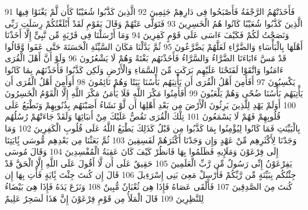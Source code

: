 \documentclass[20pt,a4paper]{article}
\begin{document}
{\tiny\colorbox{cl_aya}{91}} فَأَخَذَتْهُمُ الرَّجْفَةُ فَأَصْبَحُوا فِى دَارِهِمْ جَثِمِينَ
{\tiny\colorbox{cl_aya}{92}} الَّذِينَ كَذَّبُوا شُعَيْبًا كَأَن لَّمْ يَغْنَوْا فِيهَا الَّذِينَ كَذَّبُوا شُعَيْبًا كَانُوا هُمُ الْخَسِرِينَ
{\tiny\colorbox{cl_aya}{93}} فَتَوَلَّى عَنْهُمْ وَقَالَ يَقَوْمِ لَقَدْ أَبْلَغْتُكُمْ رِسَلَتِ رَبِّى وَنَصَحْتُ لَكُمْ فَكَيْفَ ءَاسَى عَلَى قَوْمٍ كَفِرِينَ
{\tiny\colorbox{cl_aya}{94}} وَمَا أَرْسَلْنَا فِى قَرْيَةٍ مِّن نَّبِىٍّ إِلَّا أَخَذْنَا أَهْلَهَا بِالْبَأْسَاءِ وَالضَّرَّاءِ لَعَلَّهُمْ يَضَّرَّعُونَ
{\tiny\colorbox{cl_aya}{95}} ثُمَّ بَدَّلْنَا مَكَانَ السَّيِّئَةِ الْحَسَنَةَ حَتَّى عَفَوا وَّقَالُوا قَدْ مَسَّ ءَابَاءَنَا الضَّرَّاءُ وَالسَّرَّاءُ فَأَخَذْنَهُم بَغْتَةً وَهُمْ لَا يَشْعُرُونَ
{\tiny\colorbox{cl_aya}{96}} وَلَوْ أَنَّ أَهْلَ الْقُرَى ءَامَنُوا وَاتَّقَوْا لَفَتَحْنَا عَلَيْهِم بَرَكَتٍ مِّنَ السَّمَاءِ وَالْأَرْضِ وَلَكِن كَذَّبُوا فَأَخَذْنَهُم بِمَا كَانُوا يَكْسِبُونَ
{\tiny\colorbox{cl_aya}{97}} أَفَأَمِنَ أَهْلُ الْقُرَى أَن يَأْتِيَهُم بَأْسُنَا بَيَتًا وَهُمْ نَائِمُونَ
{\tiny\colorbox{cl_aya}{98}} أَوَأَمِنَ أَهْلُ الْقُرَى أَن يَأْتِيَهُم بَأْسُنَا ضُحًى وَهُمْ يَلْعَبُونَ
{\tiny\colorbox{cl_aya}{99}} أَفَأَمِنُوا مَكْرَ اللَّهِ فَلَا يَأْمَنُ مَكْرَ اللَّهِ إِلَّا الْقَوْمُ الْخَسِرُونَ
{\tiny\colorbox{cl_aya}{100}} أَوَلَمْ يَهْدِ لِلَّذِينَ يَرِثُونَ الْأَرْضَ مِن بَعْدِ أَهْلِهَا أَن لَّوْ نَشَاءُ أَصَبْنَهُم بِذُنُوبِهِمْ وَنَطْبَعُ عَلَى قُلُوبِهِمْ فَهُمْ لَا يَسْمَعُونَ
{\tiny\colorbox{cl_aya}{101}} تِلْكَ الْقُرَى نَقُصُّ عَلَيْكَ مِنْ أَنبَائِهَا وَلَقَدْ جَاءَتْهُمْ رُسُلُهُم بِالْبَيِّنَتِ فَمَا كَانُوا لِيُؤْمِنُوا بِمَا كَذَّبُوا مِن قَبْلُ كَذَلِكَ يَطْبَعُ اللَّهُ عَلَى قُلُوبِ الْكَفِرِينَ
{\tiny\colorbox{cl_aya}{102}} وَمَا وَجَدْنَا لِأَكْثَرِهِم مِّنْ عَهْدٍ وَإِن وَجَدْنَا أَكْثَرَهُمْ لَفَسِقِينَ
{\tiny\colorbox{cl_aya}{103}} ثُمَّ بَعَثْنَا مِن بَعْدِهِم مُّوسَى بَِٔايَتِنَا إِلَى فِرْعَوْنَ وَمَلَإِيهِ فَظَلَمُوا بِهَا فَانظُرْ كَيْفَ كَانَ عَقِبَةُ الْمُفْسِدِينَ
{\tiny\colorbox{cl_aya}{104}} وَقَالَ مُوسَى يَفِرْعَوْنُ إِنِّى رَسُولٌ مِّن رَّبِّ الْعَلَمِينَ
{\tiny\colorbox{cl_aya}{105}} حَقِيقٌ عَلَى أَن لَّا أَقُولَ عَلَى اللَّهِ إِلَّا الْحَقَّ قَدْ جِئْتُكُم بِبَيِّنَةٍ مِّن رَّبِّكُمْ فَأَرْسِلْ مَعِىَ بَنِى إِسْرَءِيلَ
{\tiny\colorbox{cl_aya}{106}} قَالَ إِن كُنتَ جِئْتَ بَِٔايَةٍ فَأْتِ بِهَا إِن كُنتَ مِنَ الصَّدِقِينَ
{\tiny\colorbox{cl_aya}{107}} فَأَلْقَى عَصَاهُ فَإِذَا هِىَ ثُعْبَانٌ مُّبِينٌ
{\tiny\colorbox{cl_aya}{108}} وَنَزَعَ يَدَهُ فَإِذَا هِىَ بَيْضَاءُ لِلنَّظِرِينَ
{\tiny\colorbox{cl_aya}{109}} قَالَ الْمَلَأُ مِن قَوْمِ فِرْعَوْنَ إِنَّ هَذَا لَسَحِرٌ عَلِيمٌ
\end{document}
